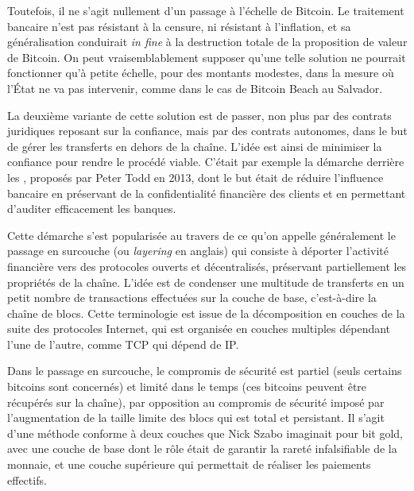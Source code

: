 Toutefois, il ne s'agit nullement d'un passage à l'échelle de Bitcoin. Le traitement bancaire n'est pas résistant à la censure, ni résistant à l'inflation, et sa généralisation conduirait \emph{in fine} à la destruction totale de la proposition de valeur de Bitcoin. On peut vraisemblablement supposer qu'une telle solution ne pourrait fonctionner qu'à petite échelle, pour des montants modestes, dans la mesure où l'État ne va pas intervenir, comme dans le cas de Bitcoin Beach au Salvador.

La deuxième variante de cette solution est de passer, non plus par des contrats juridiques reposant sur la confiance, mais par des contrats autonomes, dans le but de gérer les transferts en dehors de la chaîne. L'idée est ainsi de minimiser la confiance pour rendre le procédé viable. C'était par exemple la démarche derrière les , proposés par Peter Todd en 2013, dont le but était de réduire l'influence bancaire en préservant de la confidentialité financière des clients et en permettant d'auditer efficacement les banques.

Cette démarche s'est popularisée au travers de ce qu'on appelle généralement le passage en surcouche (ou \emph{layering} en anglais) qui consiste à déporter l'activité financière vers des protocoles ouverts et décentralisés, préservant partiellement les propriétés de la chaîne. L'idée est de condenser une multitude de transferts en un petit nombre de transactions effectuées sur la couche de base, c'est-à-dire la chaîne de blocs. Cette terminologie est issue de la décomposition en couches de la suite des protocoles Internet, qui est organisée en couches multiples dépendant l'une de l'autre, comme TCP qui dépend de IP. %

Dans le passage en surcouche, le compromis de sécurité est partiel (seuls certains bitcoins sont concernés) et limité dans le temps (ces bitcoins peuvent être récupérés sur la chaîne), par opposition au compromis de sécurité imposé par l'augmentation de la taille limite des blocs qui est total et persistant. Il s'agit d'une méthode conforme à deux couches que Nick Szabo imaginait pour bit gold, avec une couche de base dont le rôle était de garantir la rareté infalsifiable de la monnaie, et une couche supérieure qui permettait de réaliser les paiements effectifs.

